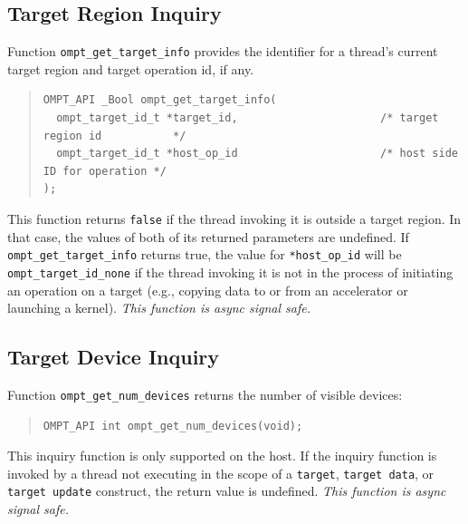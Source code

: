 \documentclass{article}
\begin{document}
\subsection{Target Region Inquiry}
\label{sec:target-region}

Function \verb|ompt_get_target_info| provides the identifier for a thread's current target region and target operation id, if any.
\begin{quote}
\begin{verbatim}
OMPT_API _Bool ompt_get_target_info(
  ompt_target_id_t *target_id,                      /* target region id           */
  ompt_target_id_t *host_op_id                      /* host side ID for operation */
);
\end{verbatim}
\end{quote}
This function returns \verb|false| if the thread invoking it is
outside a target region. In that case, the values of both of its
returned parameters are undefined. If \verb|ompt_get_target_info|
returns true, the value for \verb|*host_op_id| will be
\verb|ompt_target_id_none| if the thread invoking it is not in the process of initiating an operation on a target (e.g., copying data to or from an accelerator or launching a kernel).  {\em This function is async signal safe.}

\subsection{Target Device Inquiry}
\label{sec:target-device}
Function \verb|ompt_get_num_devices| returns the number of visible devices:
\begin{quote}
\begin{verbatim}
OMPT_API int ompt_get_num_devices(void);
\end{verbatim}
\end{quote}
This inquiry function is only supported on the host. If the inquiry function is invoked by a thread not executing in the scope of a {\tt target}, {\tt target data}, or {\tt target update} construct, the return value is undefined. {\it This function is async signal safe.}
\end{document}
